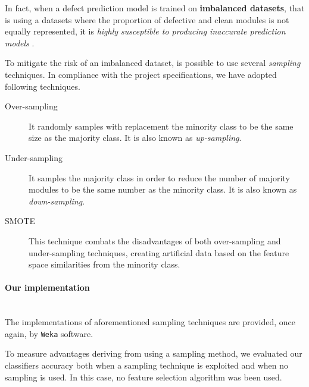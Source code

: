 \documentclass[sigconf]{acmart}
\begin{document}
In fact, when a defect prediction model is trained on \textbf{imbalanced datasets}, that is using a datasets where the proportion of defective and clean modules is not equally represented, it is \textit{highly susceptible to producing inaccurate prediction models} \cite{FalessiSampling}.

To mitigate the risk of an imbalanced dataset, is possible to use several \textit{sampling} techniques. In compliance with the project specifications, we have adopted following techniques.

\begin{description}
\item[Over-sampling] It randomly samples with replacement the minority class to be the same size as the majority class. It is also known as \textit{up-sampling}.

\item[Under-sampling] It samples the majority class in order to reduce the number of majority modules to be the same number as the minority class. It is also known as \textit{down-sampling}.

\item[SMOTE] This technique combats the disadvantages of both over-sampling and under-sampling techniques, creating artificial data based on the feature space similarities from the minority class. 

\end{description}

\paragraph{Our implementation}
\hfill\\
The implementations of aforementioned sampling techniques are provided, once again, by \texttt{Weka} software.

To measure advantages deriving from using a sampling method, we evaluated our classifiers accuracy both when a sampling technique is exploited and when no sampling is used. In this case, no feature selection algorithm was been used.
\end{document}
